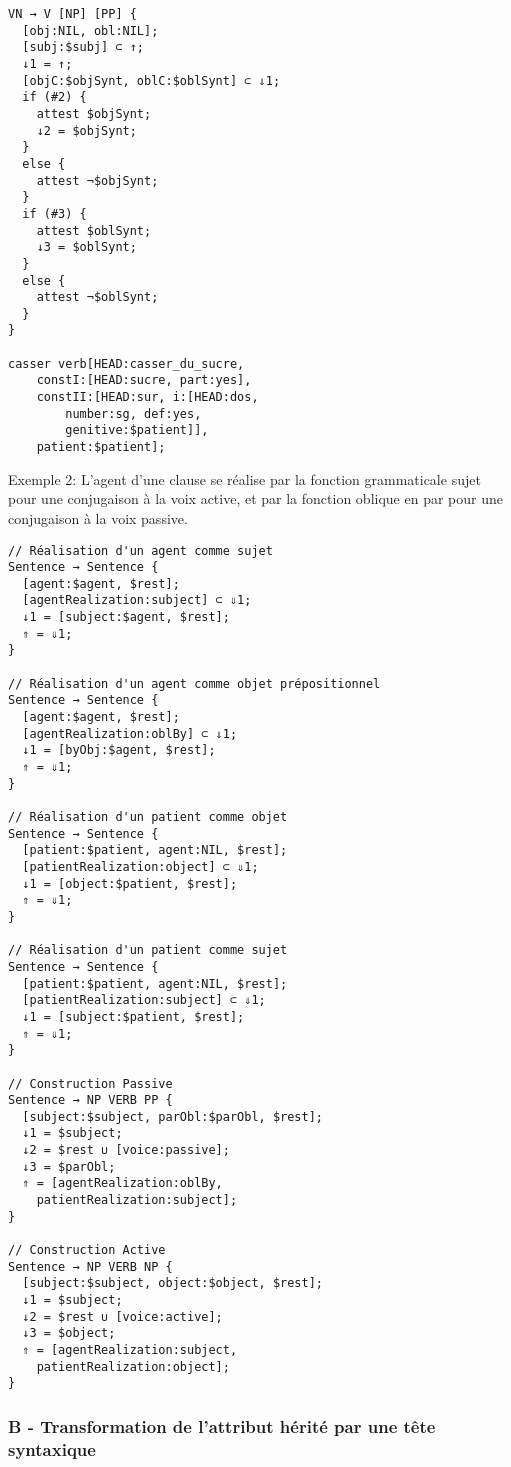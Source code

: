 \documentclass[11pt]{article}
\begin{document}
\begin{lstlisting}
VN → V [NP] [PP] {
  [obj:NIL, obl:NIL];
  [subj:$subj] ⊂ ↑;
  ↓1 = ↑;
  [objC:$objSynt, oblC:$oblSynt] ⊂ ⇓1;
  if (#2) {
    attest $objSynt;
    ↓2 = $objSynt;
  }
  else {
    attest ¬$objSynt;
  }
  if (#3) {
    attest $oblSynt;
    ↓3 = $oblSynt;
  }
  else {
    attest ¬$oblSynt;
  }
}

casser verb[HEAD:casser_du_sucre, 
	constI:[HEAD:sucre, part:yes],
	constII:[HEAD:sur, i:[HEAD:dos, 
		number:sg, def:yes, 
		genitive:$patient]],
	patient:$patient];
\end{lstlisting}


Exemple 2:
L'agent d'une clause se réalise par la fonction grammaticale sujet
pour une conjugaison à la voix active, et par la fonction oblique en
\og par\fg{} pour une conjugaison à la voix passive.

\begin{lstlisting}
// Réalisation d'un agent comme sujet
Sentence → Sentence {
  [agent:$agent, $rest];
  [agentRealization:subject] ⊂ ⇓1;
  ↓1 = [subject:$agent, $rest];
  ⇑ = ⇓1;
}

// Réalisation d'un agent comme objet prépositionnel
Sentence → Sentence {
  [agent:$agent, $rest];
  [agentRealization:oblBy] ⊂ ⇓1;
  ↓1 = [byObj:$agent, $rest];
  ⇑ = ⇓1;
}

// Réalisation d'un patient comme objet
Sentence → Sentence {
  [patient:$patient, agent:NIL, $rest];
  [patientRealization:object] ⊂ ⇓1;
  ↓1 = [object:$patient, $rest];
  ⇑ = ⇓1;
}

// Réalisation d'un patient comme sujet
Sentence → Sentence {
  [patient:$patient, agent:NIL, $rest];
  [patientRealization:subject] ⊂ ⇓1;
  ↓1 = [subject:$patient, $rest];
  ⇑ = ⇓1;
}

// Construction Passive 
Sentence → NP VERB PP {
  [subject:$subject, parObl:$parObl, $rest];
  ↓1 = $subject;
  ↓2 = $rest ∪ [voice:passive];
  ↓3 = $parObl;
  ⇑ = [agentRealization:oblBy, 
	patientRealization:subject];
}

// Construction Active
Sentence → NP VERB NP {
  [subject:$subject, object:$object, $rest];
  ↓1 = $subject;
  ↓2 = $rest ∪ [voice:active];
  ↓3 = $object;
  ⇑ = [agentRealization:subject, 
	patientRealization:object];
}
\end{lstlisting}

\subsubsection*{B - Transformation de l'attribut hérité par une tête syntaxique}
\end{document}

